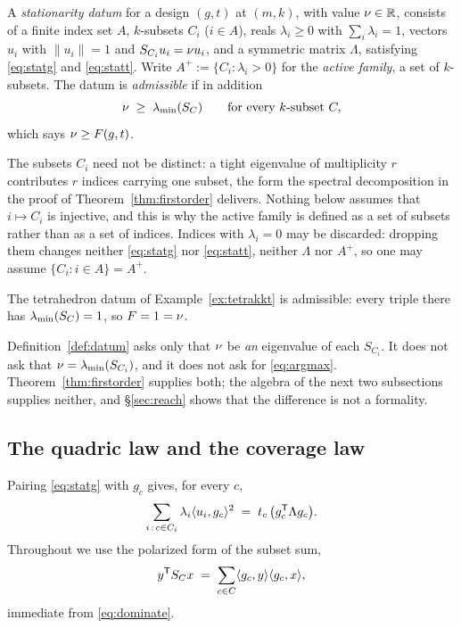 \begin{definition}\label{def:datum}
A \emph{stationarity datum} for a design $(g,t)$ at $(m,k)$, with value
$\nu\in\mathbb{R}$, consists of a finite index set $A$, $k$-subsets $C_i$
($i\in A$), reals $\lambda_i\ge0$ with $\sum_i\lambda_i=1$, vectors $u_i$
with $\lVert u_i\rVert=1$ and $S_{C_i}u_i=\nu u_i$, and a symmetric matrix
$\Lambda$, satisfying \eqref{eq:statg} and \eqref{eq:statt}.  Write
$A^{+}:=\{C_i:\lambda_i>0\}$ for the \emph{active family}, a set of
$k$-subsets.  The datum is \emph{admissible} if in addition
\begin{equation}\label{eq:argmax}
  \nu\;\ge\;\lambda_{\min}(S_{C})\qquad\text{for every }k\text{-subset }C ,
\end{equation}
which says $\nu\ge F(g,t)$.
\end{definition}

The subsets $C_i$ need not be distinct: a tight eigenvalue of
multiplicity $r$ contributes $r$ indices carrying one subset, the form
the spectral decomposition in the proof of Theorem~\ref{thm:firstorder}
delivers.  Nothing below assumes that
$i\mapsto C_i$ is injective, and this is why the active family is defined
as a set of subsets rather than as a set of indices.  Indices with
$\lambda_i=0$ may be discarded: dropping them changes neither
\eqref{eq:statg} nor \eqref{eq:statt}, neither $\Lambda$ nor $A^{+}$, so
one may assume $\{C_i:i\in A\}=A^{+}$.

The tetrahedron datum of Example~\ref{ex:tetrakkt} is admissible: every
triple there has $\lambda_{\min}(S_{C})=1$, so $F=1=\nu$.

Definition~\ref{def:datum} asks only that $\nu$ be \emph{an} eigenvalue of
each $S_{C_i}$.  It does not ask that $\nu=\lambda_{\min}(S_{C_i})$, and it does not
ask for \eqref{eq:argmax}.  Theorem~\ref{thm:firstorder} supplies both;
the algebra of the next two subsections supplies neither, and
\S\ref{sec:reach} shows that the difference is not a formality.

\subsection{The quadric law and the coverage law}\label{sec:laws}

Pairing \eqref{eq:statg} with $g_c$ gives, for every $c$,
\begin{equation}\label{eq:contract}
  \sum_{i\,:\,c\in C_i}\lambda_i\langle u_i,g_c\rangle^2
  \;=\;t_c\,\bigl(g_c^{\mathsf{T}}\Lambda g_c\bigr) .
\end{equation}
Throughout we use the polarized form of the subset sum,
\begin{equation}\label{eq:polarized}
  y^{\mathsf{T}}S_{C} x\;=\;\sum_{c\in C}\langle g_c,y\rangle\langle g_c,x\rangle ,
\end{equation}
immediate from \eqref{eq:dominate}.

